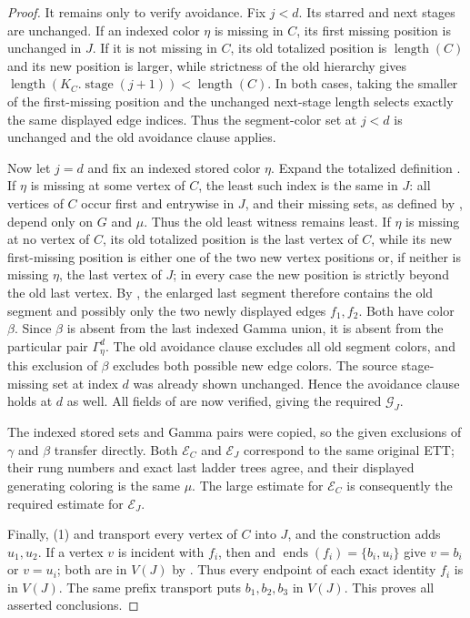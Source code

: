 \begin{proof}
It remains only to verify avoidance.  Fix $j<d$.  Its starred and next
stages are unchanged.  If an indexed color $\eta$ is missing in $C$, its
first missing position is unchanged in $J$.  If it is not missing in $C$,
its old totalized position is $\operatorname{length}(C)$ and its new
position is larger, while strictness of the old hierarchy gives
$\operatorname{length}(K_C.\operatorname{stage}(j+1))<
\operatorname{length}(C)$.  In both cases, taking the smaller of the
first-missing position and the unchanged next-stage length selects exactly
the same displayed edge indices.  Thus the segment-color set at $j<d$ is
unchanged and the old avoidance clause applies.

Now let $j=d$ and fix an indexed stored color $\eta$.  Expand the totalized definition
.  If $\eta$ is missing at some
vertex of $C$, the least such index is the same in $J$: all vertices of
$C$ occur first and entrywise in $J$, and their missing sets, as defined
by , depend only on $G$ and $\mu$.  Thus the old
least witness remains least.  If $\eta$ is
missing at no vertex of $C$, its old totalized position is the last vertex
of $C$, while its new first-missing position is either one of the two new
vertex positions or, if neither is missing $\eta$, the last vertex of
$J$; in every case the new position is strictly beyond the old last
vertex.  By , the enlarged last segment
therefore contains the old segment and possibly only the two newly
displayed edges $f_1,f_2$.  Both have color $\beta$.  Since $\beta$ is
absent from the last indexed Gamma union, it is absent from the particular
pair $\Gamma^d_\eta$.  The old avoidance clause excludes all old segment
colors, and this exclusion of $\beta$ excludes both possible new edge
colors.  The source stage-missing set at index $d$ was already shown
unchanged.  Hence the avoidance clause holds at $d$ as well.  All fields
of  are now verified, giving the required
$\mathcal G_J$.

The indexed stored sets and Gamma pairs were copied, so the given
exclusions of $\gamma$ and $\beta$ transfer directly.  Both
$\mathcal E_C$ and $\mathcal E_J$ correspond to the same original ETT;
their rung numbers and exact last ladder trees agree, and their displayed
generating coloring is the same $\mu$.  The large estimate for
$\mathcal E_C$ is consequently the required estimate for
$\mathcal E_J$.

Finally, (1) and  transport every
vertex of $C$ into $J$, and the construction adds $u_1,u_2$.  If a vertex
$v$ is incident with $f_i$, then  and
$\operatorname{ends}(f_i)=\{b_i,u_i\}$ give $v=b_i$ or $v=u_i$; both are
in $V(J)$ by .  Thus every endpoint of each
exact identity $f_i$ is in $V(J)$.  The same prefix transport puts
$b_1,b_2,b_3$ in $V(J)$.  This proves all asserted conclusions.
\end{proof}
